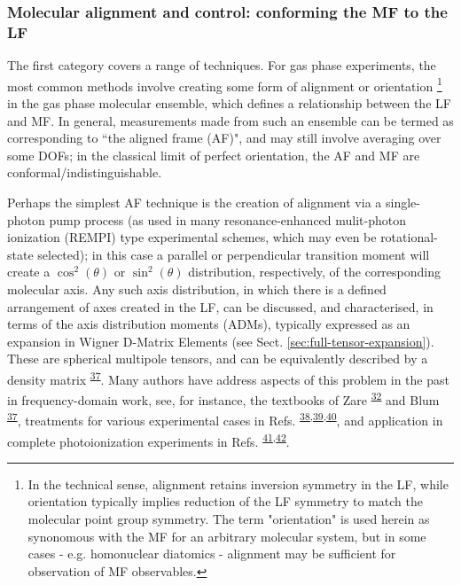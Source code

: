 \documentclass[10pt]{article}
\begin{document}
\subsubsection{Molecular alignment and control: conforming the MF to the LF\label{sec:MF-control}}

The first category covers a range of techniques. For gas phase experiments, the most common methods involve creating some form of alignment or orientation \footnote{In the technical sense, alignment retains 
inversion symmetry in the LF, while orientation typically implies reduction of the LF symmetry to match the molecular point group symmetry. The term "orientation" is used herein as synonomous with the MF for an arbitrary molecular system, but in some cases - e.g. homonuclear diatomics - alignment may be sufficient for observation of MF observables.} 
in the gas phase molecular ensemble, which defines a relationship between the LF and MF. In general, measurements made from such an ensemble can be termed as corresponding to ``the aligned frame (AF)", and may still involve averaging over some DOFs; in the 
classical limit of perfect orientation, the AF and MF are conformal/indistinguishable. 

Perhaps the simplest AF technique is the creation of alignment via a single-photon pump process (as used in many resonance-enhanced mulit-photon ionization (REMPI) type experimental schemes, which may even be rotational-state selected); in this case a parallel or perpendicular transition moment will create a $\cos^2(\theta)$ or $\sin^2(\theta)$ distribution, respectively, of the corresponding molecular axis. Any such axis distribution, in which there is a defined arrangement of axes created in the LF, can be discussed, and characterised, in terms of the axis distribution moments (ADMs), typically expressed as an expansion in Wigner D-Matrix Elements (see Sect. \ref{sec:full-tensor-expansion}). These are spherical multipole tensors, and can be equivalently described by a density matrix \textsuperscript{\hyperref[csl:37]{37}}. Many authors have address aspects of this problem in the past in frequency-domain work, see, for instance, the textbooks of Zare \textsuperscript{\hyperref[csl:32]{32}} and Blum \textsuperscript{\hyperref[csl:37]{37}}, treatments for various experimental cases in Refs. \textsuperscript{\hyperref[csl:38]{38},\hyperref[csl:39]{39},\hyperref[csl:40]{40}}, and application in complete photoionization experiments in Refs. \textsuperscript{\hyperref[csl:41]{41},\hyperref[csl:42]{42}}.
\end{document}
